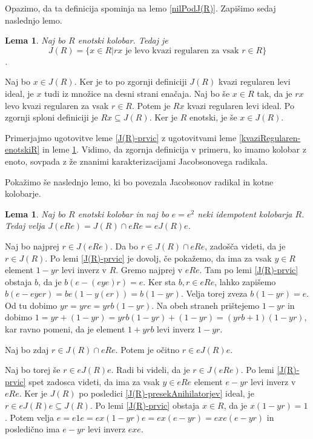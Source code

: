 \documentclass[a4paper, 12pt]{amsart}
\theoremstyle{definition} %
\theoremstyle{plain} %
\newtheorem{lema}[definicija]{Lema}
\begin{document}
Opazimo, da ta definicija spominja na lemo \ref{nilPodJ(R)}. Zapišimo sedaj naslednjo lemo.

\begin{lema}
\label{J(R)-splosen-elementi}
Naj bo $R$ enotski kolobar. Tedaj je 
$$
J(R) = \{ x\in R | rx \text{ je levo kvazi regularen za vsak } r \in R\}
$$.
\end{lema}

\proof
Naj bo $x\in J(R)$. Ker je to po zgornji definiciji $J(R)$ kvazi regularen levi ideal, je $x$ tudi iz množice na desni strani enačaja. Naj bo še $x\in R$ tak, da je $rx$ levo kvazi regularen za vsak $r\in R$. Potem je $Rx$ kvazi regularen levi ideal. Po zgornji sploni definiciji je $Rx \subseteq J(R)$. Ker je $R$ enotski, je še $x\in J(R)$. 
\endproof

Primerjajmo ugotovitve leme \ref{J(R)-prvic} z ugotovitvami leme \ref{kvaziRegularen-enotskiR} in leme \ref{J(R)-splosen-elementi}. Vidimo, da zgornja definicija v primeru, ko imamo kolobar z enoto, sovpada z že znanimi karakterizacijami Jacobsonovega radikala.

Pokažimo še naslednjo lemo, ki bo povezala Jacobsonov radikal in kotne kolobarje.

\begin{lema}
\label{J(R)-kotniKolobar}
Naj bo $R$ enotski kolobar in naj bo $e=e^2$ neki idempotent kolobarja $R$. Tedaj velja $J(eRe) = J(R) \cap eRe = eJ(R)e$.
\end{lema}

\proof
Naj bo najprej $r\in J(eRe)$. Da bo $r\in J(R) \cap eRe$, zadošča videti, da je $r\in J(R)$. Po lemi \ref{J(R)-prvic} je dovolj, če pokažemo, da ima za vsak $y\in R$ element $1-yr$ levi inverz v $R$. Gremo najprej v $eRe$. Tam po lemi \ref{J(R)-prvic} obstaja $b$, da je $b(e-(eye) r) = e$. Ker sta $b,r\in eRe$, lahko zapišemo $b(e-eyer) = be(1-y(er)) = b(1-yr)$. Velja torej zveza $b(1-yr) = e$. Od tu dobimo $yr=yre = yrb(1-yr)$. Na obeh straneh prištejemo $1-yr$ in dobimo $1 = yr + (1-yr) = yrb(1-yr) + (1-yr) = (yrb+1)(1-yr)$, kar ravno pomeni, da je element $1+yrb$ levi inverz $1-yr$.

Naj bo zdaj $r\in J(R) \cap eRe$. Potem je očitno $r\in eJ(R)e$.

Naj bo torej še $r\in eJ(R)e$. Radi bi videli, da je $r\in J(eRe)$. Po lemi \ref{J(R)-prvic} spet zadosca videti, da ima za vsak  $y\in eRe$ element $e-yr$ levi inverz v $eRe$. Ker je $J(R)$ po posledici \ref{J(R)-presekAnihilatorjev} ideal, je $r\in eJ(R)e \subseteq J(R)$. Po lemi \ref{J(R)-prvic} obstaja $x\in R$, da je $x(1-yr) = 1$. Potem velja $e = e1 e = ex(1-yr)e = ex(e-yr)= exe(e-yr)$ in posledično ima $e-yr$ levi inverz $exe$.
\endproof
\end{document}
